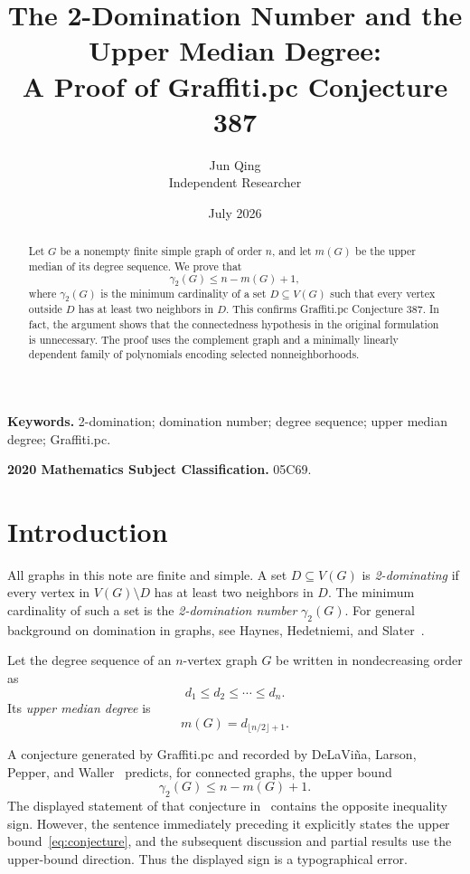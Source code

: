 \documentclass[11pt]{article}
\title{The 2-Domination Number and the Upper Median Degree:\\
A Proof of Graffiti.pc Conjecture 387}
\author{Jun Qing\\[2pt]\small Independent Researcher}
\date{July 2026}
\theoremstyle{remark}
\newcommand{\gammatwo}{\gamma_{2}}
\begin{document}
\maketitle

\begin{abstract}
Let $G$ be a nonempty finite simple graph of order $n$, and let $m(G)$ be the
upper median of its degree sequence.  We prove that
\[
  \gammatwo(G)\leq n-m(G)+1,
\]
where $\gammatwo(G)$ is the minimum cardinality of a set $D\subseteq V(G)$
such that every vertex outside $D$ has at least two neighbors in $D$.  This
confirms Graffiti.pc Conjecture 387.  In fact, the argument shows that the
connectedness hypothesis in the original formulation is unnecessary.  The
proof uses the complement graph and a minimally linearly dependent family of
polynomials encoding selected nonneighborhoods.
\end{abstract}

\noindent\textbf{Keywords.}
2-domination; domination number; degree sequence; upper median degree;
Graffiti.pc.

\medskip
\noindent\textbf{2020 Mathematics Subject Classification.}
05C69.

\section{Introduction}

All graphs in this note are finite and simple.  A set $D\subseteq V(G)$ is
\emph{2-dominating} if every vertex in $V(G)\setminus D$ has at least two
neighbors in $D$.  The minimum cardinality of such a set is the
\emph{2-domination number} $\gammatwo(G)$.  For general background on
domination in graphs, see Haynes, Hedetniemi, and Slater~\cite{HaynesEtAl}.

Let the degree sequence of an $n$-vertex graph $G$ be written in
nondecreasing order as
\[
  d_1\leq d_2\leq\cdots\leq d_n.
\]
Its \emph{upper median degree} is
\[
  m(G)=d_{\lfloor n/2\rfloor+1}.
\]

A conjecture generated by Graffiti.pc and recorded by DeLaVi{\~n}a, Larson,
Pepper, and Waller~\cite[Conjecture~1]{DeLaVinaEtAl} predicts, for connected
graphs, the upper bound
\begin{equation}\label{eq:conjecture}
  \gammatwo(G)\leq n-m(G)+1.
\end{equation}
The displayed statement of that conjecture in~\cite{DeLaVinaEtAl} contains
the opposite inequality sign.  However, the sentence immediately preceding
it explicitly states the upper bound~\eqref{eq:conjecture}, and the subsequent
discussion and partial results use the upper-bound direction.  Thus the
displayed sign is a typographical error.
\end{document}
